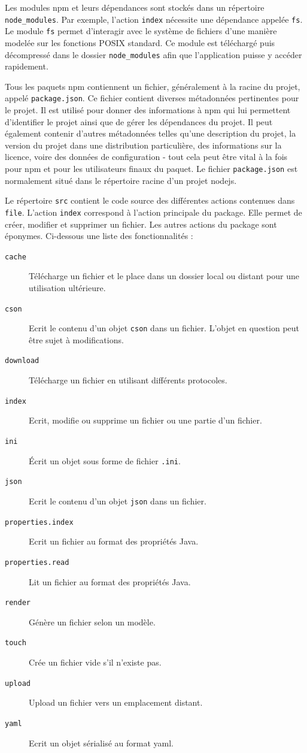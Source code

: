 \documentclass[12pt, french]{report}
\begin{document}
Les modules npm et leurs dépendances sont stockés dans un répertoire \texttt{node\_modules}. Par exemple, l'action \texttt{index} nécessite une dépendance appelée \texttt{fs}. Le module \texttt{fs} permet d'interagir avec le système de fichiers d'une manière modelée sur les fonctions POSIX standard. Ce module est téléchargé puis décompressé dans le dossier \texttt{node\_modules} afin que l'application puisse y accéder rapidement.

Tous les paquets npm contiennent un fichier, généralement à la racine du projet, appelé \texttt{package.json}. Ce fichier contient diverses métadonnées pertinentes pour le projet. Il est utilisé pour donner des informations à npm qui lui permettent d'identifier le projet ainsi que de gérer les dépendances du projet. Il peut également contenir d'autres métadonnées telles qu'une description du projet, la version du projet dans une distribution particulière, des informations sur la licence, voire des données de configuration - tout cela peut être vital à la fois pour npm et pour les utilisateurs finaux du paquet. Le fichier \texttt{package.json} est normalement situé dans le répertoire racine d'un projet \gls{nodejs}.

Le répertoire \texttt{src} contient le code source des différentes actions contenues dans \texttt{file}. L'action \texttt{index} correspond à l'action principale du package. Elle permet de créer, modifier et supprimer un fichier. Les autres actions du package sont éponymes. Ci-dessous une liste des fonctionnalités :

\begin{description}
\item[\texttt{cache}] Télécharge un fichier et le place dans un dossier local ou distant pour une utilisation ultérieure.
\item[\texttt{cson}] Ecrit le contenu d'un objet \texttt{cson} dans un fichier. L'objet en question peut être sujet à modifications.
\item[\texttt{download}] Télécharge un fichier en utilisant différents protocoles.
\item[\texttt{index}] Ecrit, modifie ou supprime un fichier ou une partie d'un fichier.
\item[\texttt{ini}] Écrit un objet sous forme de fichier \texttt{.ini}.
\item[\texttt{json}] Ecrit le contenu d'un objet \texttt{json} dans un fichier.
\item[\texttt{properties.index}] Ecrit un fichier au format des propriétés Java.
\item[\texttt{properties.read}] Lit un fichier au format des propriétés Java.
\item[\texttt{render}] Génère un fichier selon un modèle.
\item[\texttt{touch}] Crée un fichier vide s'il n'existe pas.
\item[\texttt{upload}] Upload un fichier vers un emplacement distant.
\item[\texttt{yaml}] Ecrit un objet sérialisé au format \gls{yaml}.
\end{description}
\end{document}
